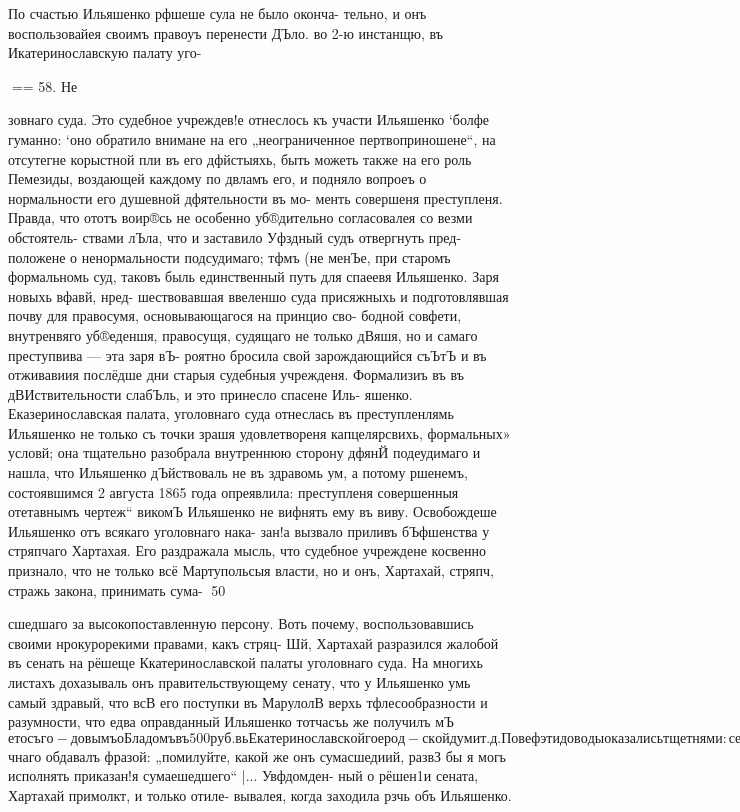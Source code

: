 По счастью Ильяшенко рфшеше сула не было оконча-
тельно, и онъ воспользовайея своимъ правоуъ перенести
ДЪло. во 2-ю инстанщю, въ Икатеринославскую палату уго-

== 58. Не

зовнаго суда. Это судебное учреждев!е отнеслось къ участи
Ильяшенко ‘болфе гуманно: ‘оно обратило внимане на его
„неограниченное пертвоприношене“, на отсутегне корыстной
пли въ его дфйстыяхь, быть можеть также на его роль
Пемезиды, воздающей каждому по двламъ его, и подняло
вопроеъ о нормальности его душевной дфятельности въ мо-
менть совершеня преступленя. Правда, что ототъ воир®сь
не особенно уб®дительно согласовалея со везми обстоятель-
ствами лЪла, что и заставило Уфздный судъ отвергнуть пред-
положене о ненормальности подсудимаго; тфмъ (не менЪе,
при старомъ формальномь суд, таковъ быль единственный
путь для спаеевя Ильяшенко. Заря новыхь вфавй, нред-
шествовавшая ввеленшо суда присяжныхь и подготовлявшая
почву для правосумя, основывающагося на принцио сво-
бодной совфети, внутренвяго уб®еденшя, правосущя, судящаго
не только дВяшя, но и самаго преступвива — эта заря вЪ-
роятно бросила свой зарождающийся съЪтЪ и въ отживавиия
послёдше дни старыя судебныя учрежденя. Формализиъ въ
въ дВИствительности слабЪль, и это принесло спасене Иль-
яшенко. Еказеринославская палата, уголовнаго суда отнеслась
въ преступленлямь Ильяшенко не только съ точки зрашя
удовлетвореня капцелярсвихь, формальных» условй; она
тщательно разобрала внутреннюю сторону дфянЙ подеудимаго
и нашла, что Ильяшенко дЪйствоваль не въ здравомь ум,
а потому ршенемъ, состоявшимся 2 августа 1865 года
опреявлила: преступленя совершенныя отетавнымъ чертеж“
викомЪ Ильяшенко не вифнять ему въ виву.
Освобождеше Ильяшенко отъ всякаго уголовнаго нака-
зан!а вызвало приливъ бЪфшенства у стряпчаго Хартахая.
Его раздражала мысль, что судебное учреждене косвенно
признало, что не только всё Мартупольсыя власти, но и
онъ, Хартахай, стряпч, стражь закона, принимать сума-
50

сшедшаго за высокопоставленную персону. Воть почему,
воспользовавшись своими нрокурорекими правами, какъ стряц-
Шй, Хартахай разразился жалобой въ сенать на рёшеще
Ккатеринославской палаты уголовнаго суда. На многихь
листахъ дохазываль онъ правительствующему сенату, что у
Ильяшенко умь самый здравый, что всВ его поступки въ
МарулолВ верхь тфлесообразности и разумности, что едва
оправданный Ильяшенко тотчасъь же получилъ мЪ$ето съ го-
довымъ оБладомъ въ 500 руб. вь Екатеринославской гоерод-
ской дум ит. д. По веф эти доводы оказались тщетнями:
сенатъ оставиль протесть Хартахая безь уваженя, удержавъ
съ него въ пользу казны 3 руб. 60 кон. пошлинъ за не-
правильную жалобу. (Л. д. 156—158 тамъ же). До рёшешя
сенала Хартахай очень горячо выражаль свое негодоваше
противь рЬшешя палаты и всакаго встр$чнаго обдавалъ
фразой: „помилуйте, какой же онъ сумасшедиий, развЗ бы
я могь исполнять приказан!я сумаешедшего“ |... Увфдомден-
ный о рёшен1и сената, Хартахай примолкт, и только отиле-
вывалея, когда заходила рзчь объ Ильяшенко.

